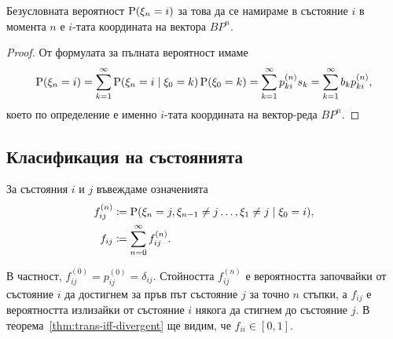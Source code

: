 \documentclass[numbers=endperiod, DIV=15, bibliography=totocnumbered]{scrartcl}
\begin{document}
\begin{corollary}
  Безусловната вероятност $\operatorname{P}(\xi_n = i)$ за това да се намираме в състояние $i$ в момента $n$ е $i$-тата координата на вектора $B P^n$.
\end{corollary}
\begin{proof}
  От формулата за пълната вероятност имаме
  \begin{displaymath}
    \operatorname{P}(\xi_n = i)
    =
    \sum_{k=1}^\infty \operatorname{P}(\xi_n = i \mid \xi_0 = k) \operatorname{P}(\xi_0 = k)
    =
    \sum_{k=1}^\infty p^{(n)}_{ki} s_k
    =
    \sum_{k=1}^\infty b_k p^{(n)}_{ki},
  \end{displaymath}
  което по определение е именно $i$-тата координата на вектор-реда $B P^n$.
\end{proof}

\subsection{Класификация на състоянията}

За състояния $i$ и $j$ въвеждаме означенията
\begin{align*}
  f_{ij}^{(n)} &\coloneqq \operatorname{P}(\xi_n = j, \xi_{n-1} \neq j \ldots, \xi_1 \neq j \mid \xi_0 = i), \\
  f_{ij} &\coloneqq \sum_{n=0}^\infty f_{ij}^{(n)}.
\end{align*}

В частност, $f_{ij}^{(0)} = p_{ij}^{(0)} = \delta_{ij}$. Стойността $f^{(n)}_{ij}$ е вероятността започвайки от състояние $i$ да достигнем за пръв път състояние $j$ за точно $n$ стъпки, а $f_{ij}$ е вероятността излизайки от състояние $i$ някога да стигнем до състояние $j$.  В теорема~\ref{thm:trans-iff-divergent} ще видим, че $f_{ii} \in [0, 1]$.
\end{document}
